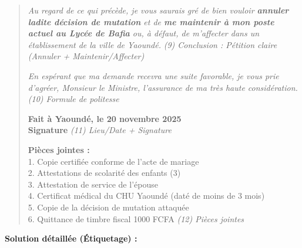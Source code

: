 \documentclass[11pt]{article}
\begin{document}
\begin{exoresolu}
\begin{quote}
\textit{Au regard de ce qui précède, je vous saurais gré de bien vouloir \textbf{annuler ladite décision de mutation} et de \textbf{me maintenir à mon poste actuel au Lycée de Bafia} ou, à défaut, de m'affecter dans un établissement de la ville de Yaoundé.} \hfill \textit{(9) Conclusion : Pétition claire (Annuler + Maintenir/Affecter)}

\textit{En espérant que ma demande recevra une suite favorable, je vous prie d'agréer, Monsieur le Ministre, l'assurance de ma très haute considération.} \hfill \textit{(10) Formule de politesse}

\textbf{Fait à Yaoundé, le 20 novembre 2025}\\
\textbf{Signature} \hfill \textit{(11) Lieu/Date + Signature}

\textbf{Pièces jointes :}\\
1. Copie certifiée conforme de l'acte de mariage\\
2. Attestations de scolarité des enfants (3)\\
3. Attestation de service de l'épouse\\
4. Certificat médical du CHU Yaoundé (daté de moins de 3 mois)\\
5. Copie de la décision de mutation attaquée\\
6. Quittance de timbre fiscal 1000 FCFA \hfill \textit{(12) Pièces jointes}
\end{quote}

\textbf{Solution détaillée (Étiquetage) :}


\end{exoresolu}
\end{document}

